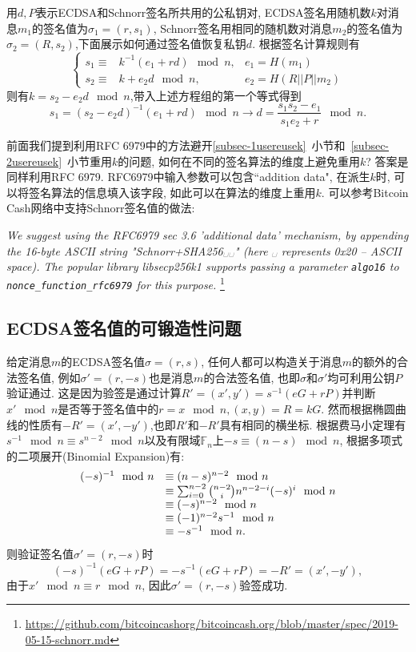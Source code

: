 \documentclass{article}
\newcommand{\F}{\mathbb{F}}
\newcommand{\code}[1]{\lstinline!#1!}
\begin{document}
用$d, P$表示ECDSA和Schnorr签名所共用的公私钥对, ECDSA签名用随机数$k$对消息$m_1$的签名值为$\sigma_1 = (r, s_1)$,
Schnorr签名用相同的随机数对消息$m_2$的签名值为$\sigma_2 = (R, s_2)$,下面展示如何通过签名值恢复私钥$d$.
根据签名计算规则有
\begin{equation}\nonumber
\left\{
\begin{array}{lll}
s_1 \equiv & k^{-1}(e_1 + rd) \mod n, & e_1 = H(m_1)\\
s_2 \equiv & k + e_2d \mod n, & e_2 = H(R||P||m_2)
\end{array}
\right.
\end{equation}
则有$k = s_2 - e_2d\mod n$,带入上述方程组的第一个等式得到
$$
s_1 =  (s_2 - e_2d)^{-1}(e_1 + rd) \mod n \rightarrow d = \dfrac{s_1s_2 - e_1}{s_1e_2 + r} \mod n.
$$

前面我们提到利用RFC 6979中的方法避开\ref{subsec-1usereusek}~小节和~\ref{subsec-2usereusek}~小节重用$k$的问题,
如何在不同的签名算法的维度上避免重用$k$? 答案是同样利用RFC 6979. 
RFC6979中输入参数可以包含``addition data", 在派生$k$时, 可以将签名算法的信息填入该字段, 如此可以在算法的维度上重用$k$.
可以参考Bitcoin Cash网络中支持Schnorr签名值的做法:

\textit{
We suggest using the RFC6979 sec 3.6 'additional data' mechanism, by appending the 16-byte ASCII string "Schnorr+SHA256␣␣" (here ␣ represents 0x20 -- ASCII space). The popular library libsecp256k1 supports passing a parameter \code{algo16} to \code{nonce_function_rfc6979} for this purpose.
}\footnote{\url{https://github.com/bitcoincashorg/bitcoincash.org/blob/master/spec/2019-05-15-schnorr.md}}

\subsection{ECDSA签名值的可锻造性问题\label{subsec-lowers}}

给定消息$m$的ECDSA签名值$\sigma=(r, s)$, 任何人都可以构造关于消息$m$的额外的合法签名值,
例如$\sigma'=(r, -s)$也是消息$m$的合法签名值, 也即$\sigma$和$\sigma'$均可利用公钥$P$验证通过.
这是因为验签是通过计算$R'=(x',y')=s^{-1}(eG + rP)$并判断$x' \mod n$是否等于签名值中的$r = x \mod n, (x, y) = R = kG$. 
然而根据椭圆曲线的性质有$-R' = (x', -y')$,也即$R'$和$-R'$具有相同的横坐标.
根据费马小定理有$s^{-1}\mod n \equiv s^{n-2} \mod n$以及有限域$\F_n$上$-s \equiv (n-s) \mod n$, 
根据多项式的二项展开(Binomial Expansion)有:
$$
\begin{array}{ll}
(-s)^{-1}\mod n & \equiv (n-s)^{n-2} \mod n \\
 & \equiv \sum_{i=0}^{n-2}\tbinom{n-2}{i}n^{n-2-i}(-s)^{i} \mod n \\
 & \equiv (-s)^{n-2} \mod n \\ 
 &  \equiv (-1)^{n-2}s^{-1}\mod n \\
 & \equiv -s^{-1}\mod n.
 \end{array}
$$
则验证签名值$\sigma'  = (r, -s)$时
$$
(-s)^{-1}(eG+rP) = -s^{-1}(eG + rP) = -R' = (x', -y'),
$$
由于$x' \mod n \equiv r \mod n$, 因此$\sigma'  = (r, -s)$验签成功.
\end{document}
